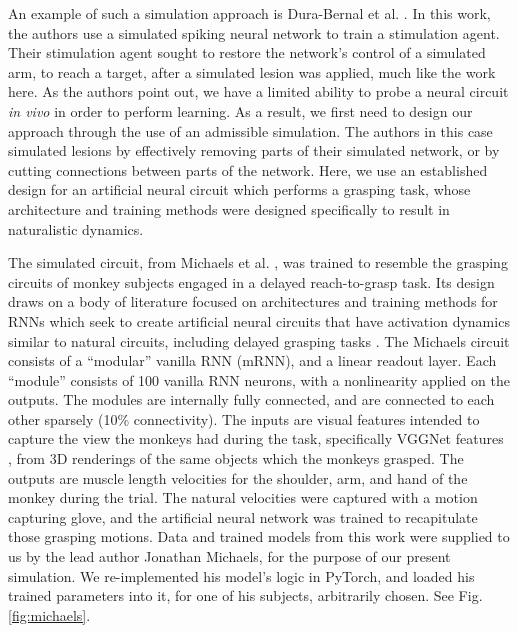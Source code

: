 \documentclass[12pt]{iopart}
\begin{document}
An example of such a simulation approach is Dura-Bernal et al. \cite{bernal.sim}. In this work, the
authors use a simulated spiking neural network to train a stimulation agent.
Their stimulation agent sought to restore the network's
control of a simulated arm, to reach a target, after a simulated lesion was applied,
much like the work here.  As the authors point out, we have a limited ability to
probe a neural circuit \textit{in vivo} in order to perform learning. As a result,
we first need to design our approach through the use of an admissible simulation.
The authors in this case simulated lesions by effectively removing parts of their
simulated network, or by cutting connections between parts of the network.
Here, we use an established design for an artificial neural circuit which
performs a grasping task, whose architecture and training methods were designed
specifically to result in naturalistic dynamics.

The simulated circuit, from Michaels et al. \cite{michaels.mrnn}, was trained
to resemble the grasping circuits of monkey subjects engaged in a delayed reach-to-grasp task.
Its design draws on a body of literature focused on architectures and training methods for RNNs which
seek to create artificial neural circuits that have activation dynamics similar to natural circuits,
including delayed grasping tasks \cite{susillo.mrnn}. The Michaels circuit consists of a
``modular'' vanilla RNN (mRNN), and a linear readout layer. Each ``module'' consists of 100 vanilla
RNN neurons, with a nonlinearity applied on the outputs. The modules are internally fully connected,
and are connected to each other sparsely (10\% connectivity). The inputs are visual features
intended to capture the view the monkeys had during the task, specifically VGGNet features \cite{simonyan.vgg},
from 3D renderings of the same objects which the monkeys grasped. The outputs are muscle length
velocities for the shoulder, arm, and hand of the monkey during the trial. The natural
velocities were captured with a motion capturing glove, and the artificial neural network
was trained to recapitulate those grasping motions. Data and trained models from this work
were supplied to us by the lead author Jonathan Michaels, for the purpose of our present
simulation. We re-implemented his model's logic in PyTorch, and loaded his trained parameters
into it, for one of his subjects, arbitrarily chosen. See Fig. \ref{fig:michaels}.
\end{document}
